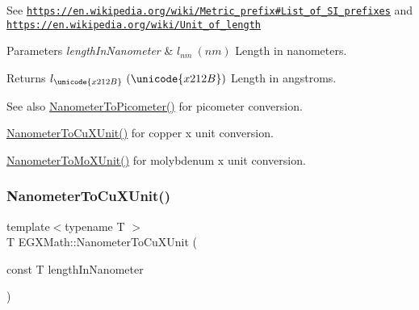 See \href{https://en.wikipedia.org/wiki/Metric_prefix#List_of_SI_prefixes}{\tt https\+://en.\+wikipedia.\+org/wiki/\+Metric\+\_\+prefix\#\+List\+\_\+of\+\_\+\+S\+I\+\_\+prefixes} and \href{https://en.wikipedia.org/wiki/Unit_of_length}{\tt https\+://en.\+wikipedia.\+org/wiki/\+Unit\+\_\+of\+\_\+length} 
\begin{DoxyParams}{Parameters}
{\em length\+In\+Nanometer} & $ l_{nm}\ (nm)$ Length in nanometers. \\
\hline
\end{DoxyParams}
\begin{DoxyReturn}{Returns}
$ l_{\unicode{x212B}}\ (\unicode{x212B})$ Length in angstroms. 
\end{DoxyReturn}
\begin{DoxySeeAlso}{See also}
\mbox{\hyperlink{group___e_g_x_math-_conversions-_length_conversions-_nanometer-_s_i_gaba1e9bf91f6e065f8ba8be8dd039b499}{Nanometer\+To\+Picometer()}} for picometer conversion. 

\mbox{\hyperlink{group___e_g_x_math-_conversions-_length_conversions-_nanometer-_non-_s_i_ga59399657caa5a9c81df2ffbe1ff7683c}{Nanometer\+To\+Cu\+X\+Unit()}} for copper x unit conversion. 

\mbox{\hyperlink{group___e_g_x_math-_conversions-_length_conversions-_nanometer-_non-_s_i_gacc6d7fa95c35687718c816df3c95c7b5}{Nanometer\+To\+Mo\+X\+Unit()}} for molybdenum x unit conversion. 
\end{DoxySeeAlso}
\mbox{\label{group___e_g_x_math-_conversions-_length_conversions-_nanometer-_non-_s_i_ga59399657caa5a9c81df2ffbe1ff7683c}} 
\subsubsection{\texorpdfstring{Nanometer\+To\+Cu\+X\+Unit()}{NanometerToCuXUnit()}}
{\footnotesize\ttfamily template$<$typename T $>$ \\
T E\+G\+X\+Math\+::\+Nanometer\+To\+Cu\+X\+Unit (\begin{DoxyParamCaption}\item[{const T}]{length\+In\+Nanometer }\end{DoxyParamCaption})}



